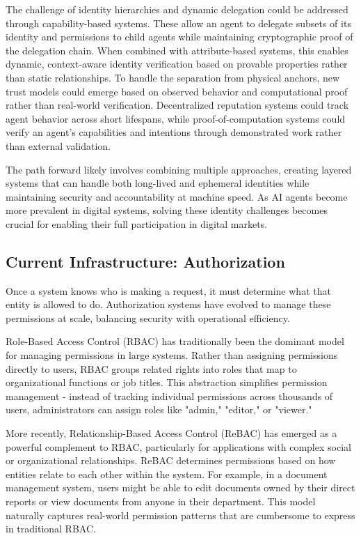\documentclass{article}
\begin{document}
The challenge of identity hierarchies and dynamic delegation could be addressed through capability-based systems. These allow an agent to delegate subsets of its identity and permissions to child agents while maintaining cryptographic proof of the delegation chain. When combined with attribute-based systems, this enables dynamic, context-aware identity verification based on provable properties rather than static relationships.
To handle the separation from physical anchors, new trust models could emerge based on observed behavior and computational proof rather than real-world verification. Decentralized reputation systems could track agent behavior across short lifespans, while proof-of-computation systems could verify an agent's capabilities and intentions through demonstrated work rather than external validation.

The path forward likely involves combining multiple approaches, creating layered systems that can handle both long-lived and ephemeral identities while maintaining security and accountability at machine speed. As AI agents become more prevalent in digital systems, solving these identity challenges becomes crucial for enabling their full participation in digital markets.


\subsection{Current Infrastructure: Authorization}
\label{subsec:authorization_current}



Once a system knows who is making a request, it must determine what that entity is allowed to do. Authorization systems have evolved to manage these permissions at scale, balancing security with operational efficiency.

Role-Based Access Control (RBAC) has traditionally been the dominant model for managing permissions in large systems. Rather than assigning permissions directly to users, RBAC groups related rights into roles that map to organizational functions or job titles. This abstraction simplifies permission management - instead of tracking individual permissions across thousands of users, administrators can assign roles like "admin," "editor," or "viewer."

More recently, Relationship-Based Access Control (ReBAC) has emerged as a powerful complement to RBAC, particularly for applications with complex social or organizational relationships. ReBAC determines permissions based on how entities relate to each other within the system. For example, in a document management system, users might be able to edit documents owned by their direct reports or view documents from anyone in their department. This model naturally captures real-world permission patterns that are cumbersome to express in traditional RBAC.
\end{document}
